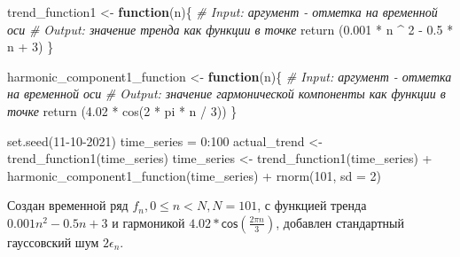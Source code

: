\documentclass[specialist,
               substylefile = spbu_report.rtx,
               subf,href,colorlinks=true, 12pt]{disser}
\theoremstyle{definition}
\newenvironment{Shaded}{\begin{snugshade}}{\end{snugshade}}
\newcommand{\AttributeTok}[1]{\textcolor[rgb]{0.77,0.63,0.00}{#1}}
\newcommand{\CommentTok}[1]{\textcolor[rgb]{0.56,0.35,0.01}{\textit{#1}}}
\newcommand{\ControlFlowTok}[1]{\textcolor[rgb]{0.13,0.29,0.53}{\textbf{#1}}}
\newcommand{\DecValTok}[1]{\textcolor[rgb]{0.00,0.00,0.81}{#1}}
\newcommand{\FloatTok}[1]{\textcolor[rgb]{0.00,0.00,0.81}{#1}}
\newcommand{\FunctionTok}[1]{\textcolor[rgb]{0.00,0.00,0.00}{#1}}
\newcommand{\NormalTok}[1]{#1}
\newcommand{\OtherTok}[1]{\textcolor[rgb]{0.56,0.35,0.01}{#1}}
\newcommand{\SpecialCharTok}[1]{\textcolor[rgb]{0.00,0.00,0.00}{#1}}
\begin{document}
\begin{Shaded}
\begin{Highlighting}[]
\NormalTok{  trend\_function1 }\OtherTok{\textless{}{-}} \ControlFlowTok{function}\NormalTok{(n)\{}
    \CommentTok{\# Input: аргумент {-} отметка на временной оси}
    \CommentTok{\# Output: значение тренда как функции в точке}
    \FunctionTok{return}\NormalTok{ (}\FloatTok{0.001} \SpecialCharTok{*}\NormalTok{ n }\SpecialCharTok{\^{}} \DecValTok{2} \SpecialCharTok{{-}} \FloatTok{0.5} \SpecialCharTok{*}\NormalTok{ n }\SpecialCharTok{+} \DecValTok{3}\NormalTok{)}
\NormalTok{  \}}
\end{Highlighting}
\end{Shaded}

\begin{Shaded}
\begin{Highlighting}[]
\NormalTok{  harmonic\_component1\_function }\OtherTok{\textless{}{-}} \ControlFlowTok{function}\NormalTok{(n)\{}
    \CommentTok{\# Input: аргумент {-} отметка на временной оси}
    \CommentTok{\# Output: значение гармонической компоненты как функции в точке}
    \FunctionTok{return}\NormalTok{ (}\FloatTok{4.02} \SpecialCharTok{*} \FunctionTok{cos}\NormalTok{(}\DecValTok{2} \SpecialCharTok{*}\NormalTok{ pi }\SpecialCharTok{*}\NormalTok{ n }\SpecialCharTok{/} \DecValTok{3}\NormalTok{))}
\NormalTok{  \}}
\end{Highlighting}
\end{Shaded}

\begin{Shaded}
\begin{Highlighting}[]
  \FunctionTok{set.seed}\NormalTok{(}\DecValTok{11{-}10{-}2021}\NormalTok{)}
\NormalTok{  time\_series }\OtherTok{=} \DecValTok{0}\SpecialCharTok{:}\DecValTok{100}
\NormalTok{  actual\_trend }\OtherTok{\textless{}{-}} \FunctionTok{trend\_function1}\NormalTok{(time\_series)}
\NormalTok{  time\_series }\OtherTok{\textless{}{-}} \FunctionTok{trend\_function1}\NormalTok{(time\_series) }\SpecialCharTok{+}
\\ \FunctionTok{harmonic\_component1\_function}\NormalTok{(time\_series) }\SpecialCharTok{+} \FunctionTok{rnorm}\NormalTok{(}\DecValTok{101}\NormalTok{, }\AttributeTok{sd =} \DecValTok{2}\NormalTok{)}
\end{Highlighting}
\end{Shaded}

Создан временной ряд \(f_n , 0\leqslant n < N, N=101\), с функцией
тренда \(0.001n^2-0.5n+3\) и гармоникой
\(4.02 * \mathsf{cos}(\frac{2\pi n}{3})\), добавлен стандартный гауссовский шум
\(2 \epsilon_n\).
\end{document}
